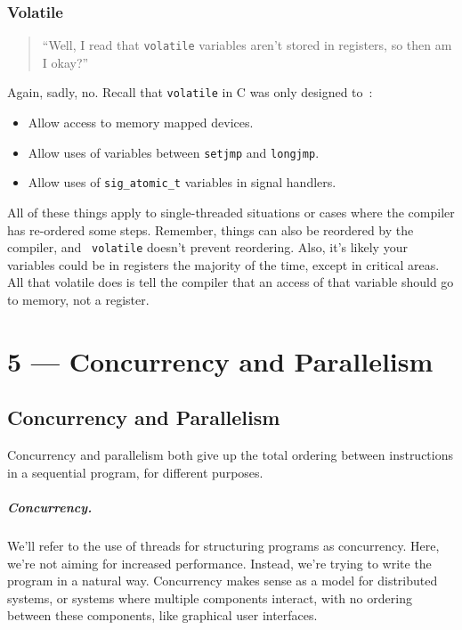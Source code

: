 \documentclass[a4paper]{report}
\begin{document}
\subsection*{Volatile}

\begin{quote}
``Well, I read that {\tt volatile} variables aren't stored in registers,
    so then am I okay?''
\end{quote}

Again, sadly, no. Recall that {\tt volatile} in C was only designed to~\cite{pr:volatile}:
      \begin{itemize}
        \item Allow access to memory mapped devices.
        \item Allow uses of variables between {\tt setjmp} and {\tt longjmp}.
        \item Allow uses of {\tt sig\_atomic\_t} variables in signal handlers.
      \end{itemize}

All of these things apply to single-threaded situations or cases where the compiler has re-ordered some steps. Remember, things can also be reordered by the compiler, and {\tt
  volatile} doesn't prevent reordering. Also, it's likely your
variables could be in registers the majority of the time, except in
critical areas. All that volatile does is tell the compiler that an access of that variable should go to memory, not a register.









\chapter*{5 --- Concurrency and Parallelism}


\section*{Concurrency and Parallelism}
Concurrency and parallelism both give up the
total ordering between instructions in a sequential program, for
different purposes.

\paragraph{Concurrency.} We'll refer to the use of threads for
structuring programs as concurrency. Here, we're not aiming
for increased performance. Instead, we're trying to write the program
in a natural way. Concurrency makes sense as a model for distributed
systems, or systems where multiple components interact, with no ordering
between these components, like graphical user interfaces.
\end{document}
